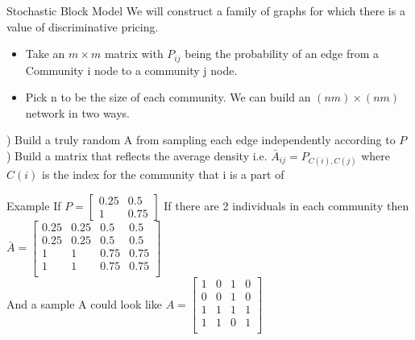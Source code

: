 \documentclass[11pt]{beamer}
\newcommand\<{\langle}
\renewcommand\>{\rangle}
\begin{document}
\begin{frame}{Stochastic Block Model}
  We will construct a family of graphs for which there is a value of discriminative pricing.\\
  \pause
  \begin{itemize}
  \item Take an $m \times m$ matrix with $P_{ij}$ being the probability of an edge from a Community i node
  to a community j node.\\
  \item Pick n to be the size of each community. We can build an $(nm) \times (nm)$ network in two ways.\\
  \end{itemize}
  ) Build a truly random A from sampling each edge independently according to $P$ \\
  ) Build a matrix that reflects the average density i.e. $\bar{A}_{ij} = P_{C(i), C(j)}$ where
  $C(i)$ is the index for the community that i is a part of
\end{frame}

\begin{frame}{Example}
  If $P =
  \begin{bmatrix}
    0.25 & 0.5 \\ 1 & 0.75
  \end{bmatrix}
  $
  If there are 2 individuals in each community then
  $\bar{A} =
  \begin{bmatrix}
    0.25 & 0.25 & 0.5 & 0.5 \\
    0.25 & 0.25 & 0.5 & 0.5 \\
    1 & 1& 0.75 & 0.75 \\
    1 & 1& 0.75 & 0.75 \\
  \end{bmatrix}
  $ \\
  \pause
  And a sample A could look like
   $A =
  \begin{bmatrix}
    1& 0 & 1 & 0 \\
    0 & 0 & 1 & 0 \\
    1 & 1& 1 & 1 \\
    1 & 1& 0 & 1 \\
  \end{bmatrix}
  $
\end{frame}
\end{document}
